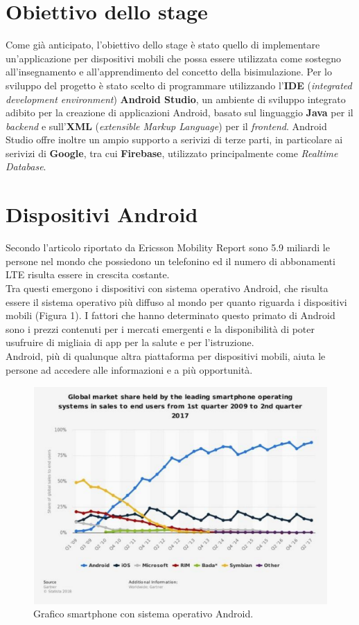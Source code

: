 \documentclass[a4paper,11pt,twoside,openright]{report}
\begin{document}
\section*{Obiettivo dello stage}
Come già anticipato, l'obiettivo dello stage è stato quello di implementare un'applicazione per dispositivi mobili che possa essere utilizzata come sostegno all'insegnamento e all'apprendimento del concetto della bisimulazione. Per lo sviluppo del progetto è stato scelto di programmare utilizzando l'\textbf{IDE} (\textit{integrated development environment})  \textbf{Android Studio}, un ambiente di sviluppo integrato adibito per la creazione di applicazioni Android, basato sul linguaggio \textbf{Java} per il \textit{backend} e sull'\textbf{XML} (\textit{extensible Markup Language}) per il \textit{frontend}. Android Studio offre inoltre un ampio supporto a serivizi di terze parti, in particolare ai serivizi di \textbf{Google}, tra cui \textbf{Firebase}, utilizzato principalmente come \textit{Realtime Database}.

\section*{Dispositivi Android}
Secondo l'articolo riportato da Ericsson Mobility Report \cite{2} sono 5.9 miliardi le persone nel mondo che possiedono un telefonino ed il numero di abbonamenti LTE risulta essere in crescita costante.\\
Tra questi emergono i dispositivi con sistema operativo Android, che risulta essere il sistema operativo più diffuso al mondo per quanto riguarda i dispositivi mobili (Figura 1). I fattori che hanno determinato questo primato di Android sono i prezzi contenuti per i mercati emergenti e la disponibilità di poter usufruire di migliaia di app per la salute e per l'istruzione.\\
Android, più di qualunque altra piattaforma per dispositivi mobili, aiuta le persone ad accedere alle informazioni e a più opportunità.

\begin{figure}[h]
\includegraphics[width=\textwidth]{images/Smartphone Android.png}
\caption{Grafico smartphone con sistema operativo Android.}
\end{figure}
\end{document}
